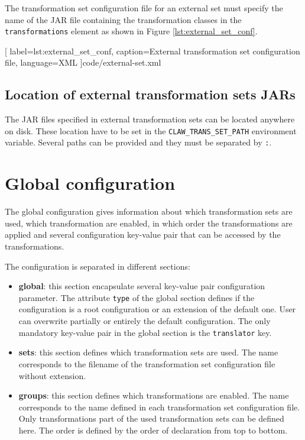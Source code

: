 The transformation set configuration file for an external set must specify the
name of the JAR file containing the transformation classes in the 
\lstinline|transformations| element as shown in Figure 
\ref{lst:external_set_conf}. 


  [
    label=lst:external_set_conf,
    caption=External transformation set configuration file,
    language=XML
  ]{code/external-set.xml}
  
\subsection{Location of external transformation sets JARs}
The JAR files specified in external transformation sets can be located anywhere
on disk. These location have to be set in the \lstinline!CLAW_TRANS_SET_PATH!
environment variable.
Several paths can be provided and they must be separated by \lstinline!:!.


\section{\clawfcomp Global configuration}
The global configuration gives information about which transformation sets are
used, which transformation are enabled, in which order the transformations are
applied and several configuration key-value pair that can be accessed by the 
transformations. 

The configuration is separated in different sections: 
\begin{itemize}
\item \textbf{global}: this section encapsulate several key-value pair 
      configuration parameter. The attribute \lstinline!type! of the global
      section defines if the configuration is a root configuration or an 
      extension of the default one. User can overwrite partially or entirely
      the default configuration.
      The only mandatory key-value pair in the global section is the 
      \lstinline!translator! key.
\item \textbf{sets}: this section defines which transformation sets are used.
      The name corresponds to the filename of the transformation set 
      configuration file without extension.
\item \textbf{groups}: this section defines which transformations are enabled.
      The name corresponds to the name defined in each transformation set 
      configuration file.
      Only transformations part of the used transformation sets can be defined
      here.
      The order is defined by the order of declaration from top to bottom.
\end{itemize}



